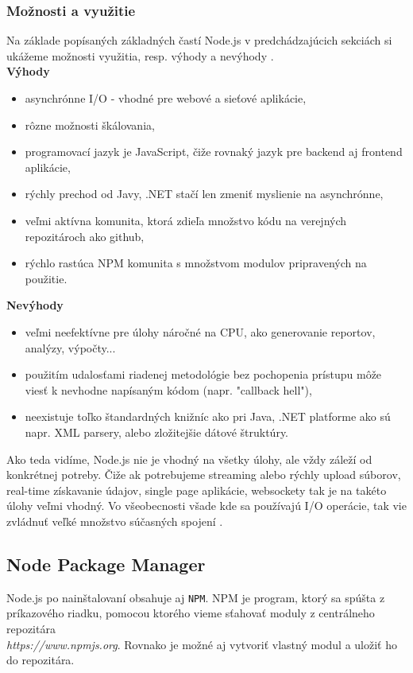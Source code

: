 \subsubsection{Možnosti a využitie}
Na základe popísaných základných častí Node.js v predchádzajúcich sekciách si ukážeme možnosti využitia, resp. výhody a nevýhody \cite{nodejs-arch}.\\

\noindent \textbf{Výhody}
\begin{itemize}
\item asynchrónne I/O - vhodné pre webové a sieťové aplikácie,
\item rôzne možnosti škálovania,
\item programovací jazyk je JavaScript, čiže rovnaký jazyk pre backend aj frontend aplikácie,
\item rýchly prechod od Javy, .NET stačí len zmeniť myslienie na asynchrónne,
\item veľmi aktívna komunita, ktorá zdieľa množstvo kódu na verejných repozitároch ako github,
\item rýchlo rastúca NPM komunita s množstvom modulov pripravených na použitie.
\end{itemize}

\noindent \textbf{Nevýhody}
\begin{itemize}
\item veľmi neefektívne pre úlohy náročné na CPU, ako generovanie reportov, analýzy, výpočty...
\item použitím udalosťami riadenej metodológie bez pochopenia prístupu môže viesť k nevhodne napísaným kódom (napr. "callback hell"),
\item neexistuje toľko štandardných knižníc ako pri Java, .NET platforme ako sú napr. XML parsery, alebo zložitejšie dátové štruktúry.
\end{itemize}

Ako teda vidíme, Node.js nie je vhodný na všetky úlohy, ale vždy záleží od konkrétnej potreby. Čiže ak potrebujeme streaming alebo rýchly upload súborov, real-time získavanie údajov, single page aplikácie, websockety tak je na takéto úlohy veľmi vhodný. Vo všeobecnosti všade kde sa používajú I/O operácie, tak vie zvládnuť veľké množstvo súčasných spojení \cite{nodejs-introduction}.

\subsection{Node Package Manager}
Node.js po nainštalovaní obsahuje aj \verb|NPM|. NPM je program, ktorý sa spúšta z príkazového riadku, pomocou ktorého vieme sťahovať moduly z centrálneho repozitára\\ \textit{https://www.npmjs.org}. Rovnako je možné aj vytvoriť vlastný modul a uložiť ho do repozitára.

